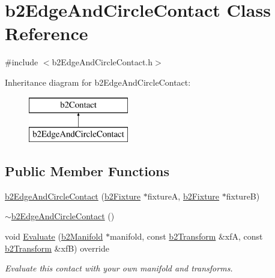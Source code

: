 \hypertarget{classb2_edge_and_circle_contact}{}\section{b2\+Edge\+And\+Circle\+Contact Class Reference}
\label{classb2_edge_and_circle_contact}


{\ttfamily \#include $<$b2\+Edge\+And\+Circle\+Contact.\+h$>$}

Inheritance diagram for b2\+Edge\+And\+Circle\+Contact\+:\begin{figure}[H]
\begin{center}
\leavevmode
\includegraphics[height=2.000000cm]{classb2_edge_and_circle_contact}
\end{center}
\end{figure}
\subsection*{Public Member Functions}
\begin{DoxyCompactItemize}
\item 
\mbox{\hyperlink{classb2_edge_and_circle_contact_a9de91d6afe4d2407f679b2ccaded9c02}{b2\+Edge\+And\+Circle\+Contact}} (\mbox{\hyperlink{classb2_fixture}{b2\+Fixture}} $\ast$fixtureA, \mbox{\hyperlink{classb2_fixture}{b2\+Fixture}} $\ast$fixtureB)
\item 
\mbox{\hyperlink{classb2_edge_and_circle_contact_a4e292462d90ad267adbac3670077eade}{$\sim$b2\+Edge\+And\+Circle\+Contact}} ()
\item 
void \mbox{\hyperlink{classb2_edge_and_circle_contact_aec021f688dcf2b5a2c483edde476d4b6}{Evaluate}} (\mbox{\hyperlink{structb2_manifold}{b2\+Manifold}} $\ast$manifold, const \mbox{\hyperlink{structb2_transform}{b2\+Transform}} \&xfA, const \mbox{\hyperlink{structb2_transform}{b2\+Transform}} \&xfB) override
\begin{DoxyCompactList}\small\item\em Evaluate this contact with your own manifold and transforms. \end{DoxyCompactList}\end{DoxyCompactItemize}
